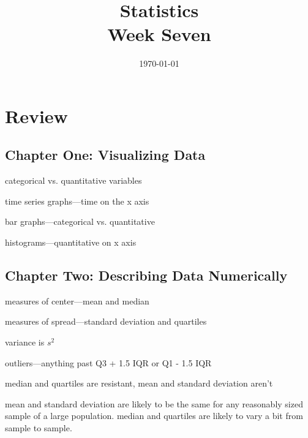\documentclass[landscape]{exam}
\title{Statistics \\ Week Seven}
\date{\today}
\author{}
\begin{document}
  \maketitle

  \section{Review}
  \subsection{Chapter One: Visualizing Data}
  \begin{itemize*}
    \item categorical vs. quantitative variables
    \item time series graphs---time on the x axis
    \item bar graphs---categorical vs. quantitative
    \item histograms---quantitative on x axis
  \end{itemize*}

  \subsection{Chapter Two: Describing Data Numerically}
  \begin{itemize*}
    \item measures of center---mean and median
    \item measures of spread---standard deviation and quartiles
    \item variance is $s^2$
    \item outliers---anything past Q3 + 1.5 IQR or Q1 - 1.5 IQR
    \item median and quartiles are resistant, mean and standard deviation aren't
    \item mean and standard deviation are likely to be the same for any
      reasonably sized sample of a large population.  median and quartiles are
      likely to vary a bit from sample to sample.
  \end{itemize*}
\end{document}
